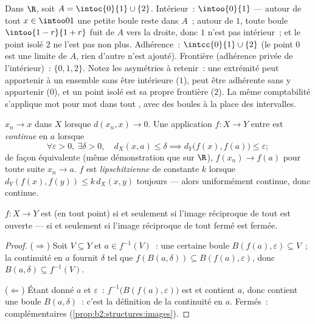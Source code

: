\begin{example}\label{ex:b2:metric:intclosure}
Dans $\R$, soit $A = \intoc{0}{1} \cup \{2\}$. Intérieur~:
$\intoo{0}{1}$ --- autour de tout $x \in \intoo01$ une petite boule
reste dans $A$~; autour de $1$, toute boule $\intoo{1-r}{1+r}$ fuit
de $A$ vers la droite, donc $1$ n'est pas intérieur~; et le point
isolé $2$ ne l'est pas non plus. Adhérence~:
$\intcc{0}{1} \cup \{2\}$ (le point $0$ est une limite de $A$,
rien d'autre n'est ajouté). Frontière (adhérence privée de
l'intérieur)~: $\{0, 1, 2\}$. Notez les asymétries à retenir~: une
extrémité peut appartenir à un ensemble sans être intérieure ($1$),
peut être adhérente sans y appartenir ($0$), et un point isolé est
sa propre frontière ($2$). La même comptabilité s'applique mot pour
mot dans tout , avec des boules à la place des
intervalles.
\end{example}

\begin{definition}\label{def:b2:metric:continuity}
$x_n \to x$ dans $X$ lorsque $d(x_n, x) \to 0$. Une application $f
\colon X \to Y$ entre  est
\emph{continue} en $a$ lorsque
\[
\forall \varepsilon > 0,\ \exists\delta > 0,\quad
d_X(x, a) \leq \delta \implies d_Y\bigl(f(x), f(a)\bigr) \leq
\varepsilon ;
\]
de façon équivalente (même démonstration que sur $\R$), $f(x_n) \to
f(a)$ pour toute suite $x_n \to a$. $f$ est
\emph{lipschitzienne} de constante $k$ lorsque
$d_Y(f(x), f(y)) \leq k\, d_X(x, y)$ toujours --- alors uniformément
continue, donc continue.
\end{definition}

\begin{theorem}\label{thm:b2:metric:globalcontinuity}
$f \colon X \to Y$ est  (en tout point) si et seulement si
l'image réciproque de tout  est ouverte --- si et seulement si
l'image réciproque de tout fermé est fermée.
\end{theorem}

\begin{proof}
($\Rightarrow$) Soit $V \subseteq Y$  et $a \in f^{-1}(V)$~:
une certaine boule $B(f(a), \varepsilon) \subseteq V$~; la continuité
en $a$ fournit $\delta$ tel que $f(B(a, \delta)) \subseteq B(f(a),
\varepsilon)$, donc $B(a, \delta) \subseteq f^{-1}(V)$.

($\Leftarrow$) Étant donné $a$ et $\varepsilon$~: $f^{-1}\bigl(B(f(a),
\varepsilon)\bigr)$ est  et contient $a$, donc contient une
boule $B(a, \delta)$~: c'est la définition de la continuité en $a$.
Fermés~: complémentaires (\cref{prop:b2:structures:images}).
\end{proof}

